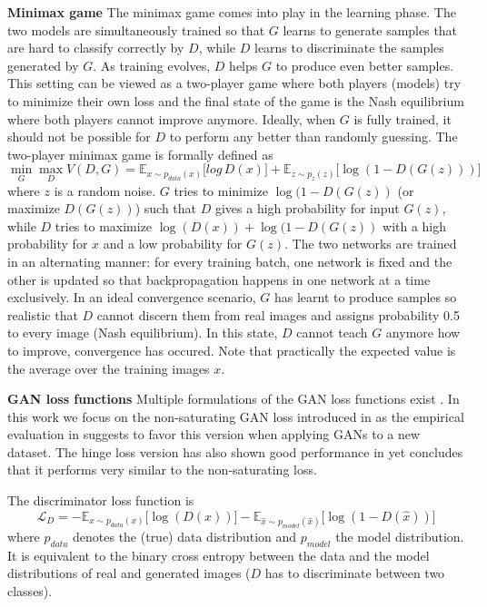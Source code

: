 \documentclass[a4paper,12pt]{report}
\begin{document}
\par \textbf{Minimax game} The minimax game comes into play in the learning phase. The two models are simultaneously trained so that $G$ learns to generate samples that are hard to classify correctly by $D$, while $D$ learns to discriminate the samples generated by $G$. As training evolves, $D$ helps $G$ to produce even better samples. This setting can be viewed as a two-player game where both players (models) try to minimize their own loss and the final state of the game is the Nash equilibrium where both players cannot improve anymore. Ideally, when $G$ is fully trained, it should not be possible for $D$ to perform any better than randomly guessing. The two-player minimax game is formally defined as
\begin{equation} \label{eq:1}
\min\limits_{G} \max\limits_{D} V(D,G) = \mathbb{E}_{x\sim p_{data} (x)}\big[log\, D(x)\big] + \mathbb{E}_{z\sim p_{z} (z)}\big[\log(1 - D(G(z)))\big]
\end{equation}
where $z$ is a random noise. $G$ tries to minimize $\log(1 - D(G(z))$ (or maximize $D(G(z))$) such that $D$ gives a high probability for input $G(z)$, while $D$ tries to maximize $\log(D(x)) + \log(1 - D(G(z))$ with a high probability for $x$ and a low probability for $G(z)$. The two networks are trained in an alternating manner: for every training batch, one network is fixed and the other is updated so that backpropagation happens in one network at a time exclusively. In an ideal convergence scenario, $G$ has learnt to produce samples so realistic that $D$ cannot discern them from real images and assigns probability 0.5 to every image (Nash equilibrium). In this state, $D$ cannot teach $G$ anymore how to improve, convergence has occured. Note that practically the expected value is the average over the training images $x$.

\par \textbf{GAN loss functions} 
Multiple formulations of the GAN loss functions exist \cite{GANLandscape}. In this work we focus on the non-saturating GAN loss introduced in \cite{1406.2661} as the empirical evaluation in \cite{GANLandscape} suggests to favor this version when applying GANs to a new dataset. The hinge loss version has also shown good performance in \cite{SNGAN} yet \cite{GANLandscape} concludes that it performs very similar to the non-saturating loss.

The discriminator loss function is
\begin{equation} \label{eq:d_loss}
    \mathcal{L}_{D} = -\mathbb{E}_{x\sim p_{data} (x)}\big[\log(D(x))\big] - \mathbb{E}_{\hat{x}\sim p_{model} (\hat{x})}\big[\log(1 - D(\hat{x}))\big]
\end{equation}
where $p_{data}$ denotes the (true) data distribution and $p_{model}$ the model distribution. It is equivalent to the binary cross entropy between the data and the model distributions of real and generated images ($D$ has to discriminate between two classes).
\end{document}
